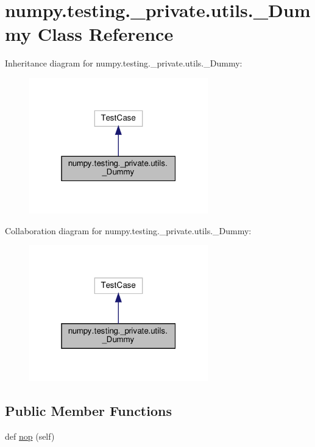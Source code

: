 \hypertarget{classnumpy_1_1testing_1_1__private_1_1utils_1_1__Dummy}{}\section{numpy.\+testing.\+\_\+private.\+utils.\+\_\+\+Dummy Class Reference}
\label{classnumpy_1_1testing_1_1__private_1_1utils_1_1__Dummy}


Inheritance diagram for numpy.\+testing.\+\_\+private.\+utils.\+\_\+\+Dummy\+:
\nopagebreak
\begin{figure}[H]
\begin{center}
\leavevmode
\includegraphics[width=220pt]{classnumpy_1_1testing_1_1__private_1_1utils_1_1__Dummy__inherit__graph}
\end{center}
\end{figure}


Collaboration diagram for numpy.\+testing.\+\_\+private.\+utils.\+\_\+\+Dummy\+:
\nopagebreak
\begin{figure}[H]
\begin{center}
\leavevmode
\includegraphics[width=220pt]{classnumpy_1_1testing_1_1__private_1_1utils_1_1__Dummy__coll__graph}
\end{center}
\end{figure}
\subsection*{Public Member Functions}
\begin{DoxyCompactItemize}
\item 
def \hyperlink{classnumpy_1_1testing_1_1__private_1_1utils_1_1__Dummy_af338368836dec9d81a4c316a2ed799f0}{nop} (self)
\end{DoxyCompactItemize}


